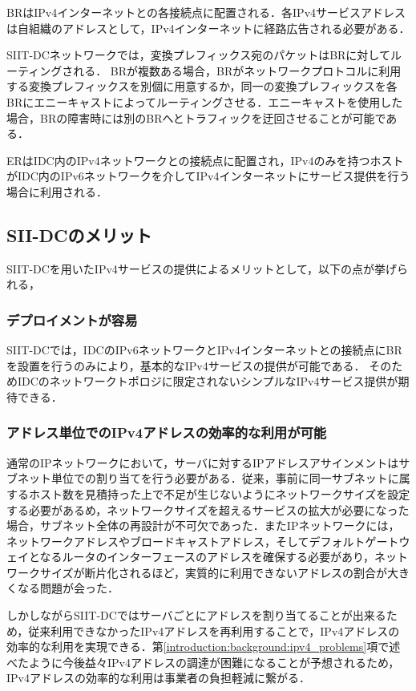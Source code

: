 BRはIPv4インターネットとの各接続点に配置される．各IPv4サービスアドレスは自組織のアドレスとして，IPv4インターネットに経路広告される必要がある．

SIIT-DCネットワークでは，変換プレフィックス宛のパケットはBRに対してルーティングされる．
BRが複数ある場合，BRがネットワークプロトコルに利用する変換プレフィックスを別個に用意するか，同一の変換プレフィックスを各BRにエニーキャスト\cite{RFC4786}によってルーティングさせる．エニーキャストを使用した場合，BRの障害時には別のBRへとトラフィックを迂回させることが可能である．

ERはIDC内のIPv4ネットワークとの接続点に配置され，IPv4のみを持つホストがIDC内のIPv6ネットワークを介してIPv4インターネットにサービス提供を行う場合に利用される．


\subsection{SII-DCのメリット}
\label{issue:siit-dc-merit}
SIIT-DCを用いたIPv4サービスの提供によるメリットとして，以下の点が挙げられる，

\subsubsection{デプロイメントが容易}
SIIT-DCでは，IDCのIPv6ネットワークとIPv4インターネットとの接続点にBRを設置を行うのみにより，基本的なIPv4サービスの提供が可能である．
そのためIDCのネットワークトポロジに限定されないシンプルなIPv4サービス提供が期待できる．

\subsubsection{アドレス単位でのIPv4アドレスの効率的な利用が可能}
通常のIPネットワークにおいて，サーバに対するIPアドレスアサインメントはサブネット単位での割り当てを行う必要がある．従来，事前に同一サブネットに属するホスト数を見積持った上で不足が生じないようにネットワークサイズを設定する必要があるめ，ネットワークサイズを超えるサービスの拡大が必要になった場合，サブネット全体の再設計が不可欠であった．またIPネットワークには，ネットワークアドレスやブロードキャストアドレス，そしてデフォルトゲートウェイとなるルータのインターフェースのアドレスを確保する必要があり，ネットワークサイズが断片化されるほど，実質的に利用できないアドレスの割合が大きくなる問題が会った．

しかしながらSIIT-DCではサーバごとにアドレスを割り当てることが出来るため，従来利用できなかったIPv4アドレスを再利用することで，IPv4アドレスの効率的な利用を実現できる．第\ref{introduction:background:ipv4_problems}項で述べたように今後益々IPv4アドレスの調達が困難になることが予想されるため，IPv4アドレスの効率的な利用は事業者の負担軽減に繋がる．


